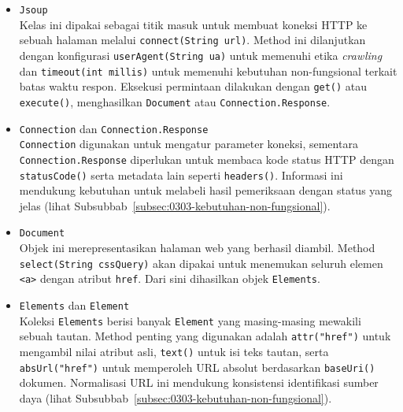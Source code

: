 \begin{itemize}
  \item \texttt{Jsoup}\\
  Kelas ini dipakai sebagai titik masuk untuk membuat koneksi HTTP ke sebuah halaman melalui \texttt{connect(String url)}. Method ini dilanjutkan dengan konfigurasi \texttt{userAgent(String ua)} untuk memenuhi etika \textit{crawling} dan \texttt{timeout(int millis)} untuk memenuhi kebutuhan non-fungsional terkait batas waktu respon. Eksekusi permintaan dilakukan dengan \texttt{get()} atau \texttt{execute()}, menghasilkan \texttt{Document} atau \texttt{Connection.Response}.

  \item \texttt{Connection} dan \texttt{Connection.Response}\\
  \texttt{Connection} digunakan untuk mengatur parameter koneksi, sementara \texttt{Connection.Response} diperlukan untuk membaca kode status HTTP dengan \texttt{statusCode()} serta metadata lain seperti \texttt{headers()}. Informasi ini mendukung kebutuhan untuk melabeli hasil pemeriksaan dengan status yang jelas (lihat Subsubbab~\ref{subsec:0303-kebutuhan-non-fungsional}).

  \item \texttt{Document}\\
  Objek ini merepresentasikan halaman web yang berhasil diambil. Method \texttt{select(String cssQuery)} akan dipakai untuk menemukan seluruh elemen \texttt{<a>} dengan atribut \texttt{href}. Dari sini dihasilkan objek \texttt{Elements}.

  \item \texttt{Elements} dan \texttt{Element}\\
  Koleksi \texttt{Elements} berisi banyak \texttt{Element} yang masing-masing mewakili sebuah tautan. Method penting yang digunakan adalah \texttt{attr("href")} untuk mengambil nilai atribut asli, \texttt{text()} untuk isi teks tautan, serta \texttt{absUrl("href")} untuk memperoleh URL absolut berdasarkan \texttt{baseUri()} dokumen. Normalisasi URL ini mendukung konsistensi identifikasi sumber daya (lihat Subsubbab~\ref{subsec:0303-kebutuhan-non-fungsional}).

\end{itemize}
